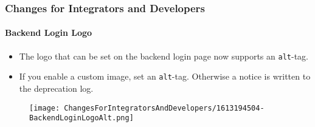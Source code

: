 %

\begin{frame}[fragile]
	\frametitle{Changes for Integrators and Developers}
	\framesubtitle{Backend Login Logo}


	\begin{itemize}
		\item The logo that can be set on the backend login page now supports
			an \texttt{alt}-tag.
		\item If you enable a custom image, set an \texttt{alt}-tag.
			Otherwise a notice is written to the deprecation log.
	\end{itemize}

	\begin{figure}
		\texttt{[image: ChangesForIntegratorsAndDevelopers/1613194504-BackendLoginLogoAlt.png]}
	\end{figure}

\end{frame}

